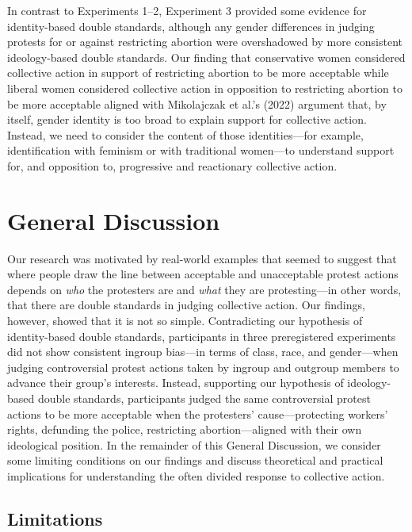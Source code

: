 \documentclass[12pt, letterpaper]{article}
\begin{document}
In contrast to Experiments 1--2, Experiment 3 provided some evidence for
identity-based double standards, although any gender differences in
judging protests for or against restricting abortion were overshadowed
by more consistent ideology-based double standards. Our finding that
conservative women considered collective action in support of
restricting abortion to be more acceptable while liberal women
considered collective action in opposition to restricting abortion to be
more acceptable aligned with Mikolajczak et al.'s (2022) argument that,
by itself, gender identity is too broad to explain support for
collective action. Instead, we need to consider the content of those
identities---for example, identification with feminism or with
traditional women---to understand support for, and opposition to,
progressive and reactionary collective action.

\hypertarget{general-discussion}{%
\section{General Discussion}\label{general-discussion}}

Our research was motivated by real-world examples that seemed to suggest
that where people draw the line between acceptable and unacceptable
protest actions depends on \emph{who} the protesters are and \emph{what}
they are protesting---in other words, that there are double standards in
judging collective action. Our findings, however, showed that it is not
so simple. Contradicting our hypothesis of identity-based double
standards, participants in three preregistered experiments did not show
consistent ingroup bias---in terms of class, race, and gender---when
judging controversial protest actions taken by ingroup and outgroup
members to advance their group's interests. Instead, supporting our
hypothesis of ideology-based double standards, participants judged the
same controversial protest actions to be more acceptable when the
protesters' cause---protecting workers' rights, defunding the police,
restricting abortion---aligned with their own ideological position. In
the remainder of this General Discussion, we consider some limiting
conditions on our findings and discuss theoretical and practical
implications for understanding the often divided response to collective
action.

\hypertarget{limitations}{%
\subsection{Limitations}\label{limitations}}
\end{document}
